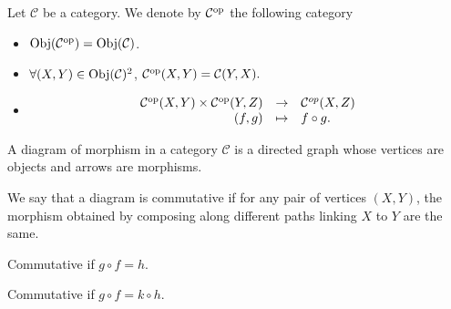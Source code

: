 \begin{definitionenv}
    Let $\mathcal{C}$ be a category. We denote by $\mathcal{C}^{\mathrm{op}}$ the following category
    \begin{itemize}
        \item $\mathrm{Obj}(\mathcal{C}^{\mathrm{op}}) = \mathrm{Obj}(\mathcal{C})$.
        \item $\forall (X,Y)\in \mathrm{Obj}(\mathcal{C})^2$, $\mathcal{C}^{\mathrm{op}}(X,Y) = \mathcal{C}(Y,X).$
        \item $$\begin{array}{rcl}
            \mathcal{C}^{\mathrm{op}}(X,Y)\times \mathcal{C}^{\mathrm{op}}(Y,Z)&\rightarrow&\mathcal{C}^{op}(X,Z)\\
            (f,g)&\mapsto&f\circ g.
        \end{array}$$
    \end{itemize}
        \begin{center}
\end{center}
\end{definitionenv}
\begin{definitionenv}
    A diagram of morphism in a category $\mathcal{C}$ is a directed graph whose vertices are objects and arrows are morphisms.

    \quad We say that a diagram is commutative if for any pair of vertices $(X,Y)$, the morphism obtained by composing along different paths linking $X$ to $Y$ are the same.
\end{definitionenv}
\begin{exampleenv}
    \quad \newline
    Commutative if $g\circ f =h$.
    \begin{center}
\end{center}
Commutative if $g\circ f =k\circ h$.
    \begin{center}
\end{center}
\end{exampleenv}
\newpage
